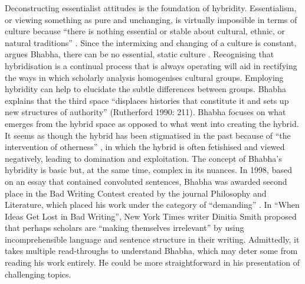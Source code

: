 	Deconstructing essentialist attitudes is the foundation of hybridity. Essentialism, or viewing something as pure and unchanging, is virtually impossible in terms of culture because “there is nothing essential or stable about cultural, ethnic, or natural traditions” \parencite [5] {VossAllen_2008}. Since the intermixing and changing of a culture is constant, argues Bhabha, there can be no essential, static culture \parencite[52] {Bhabha_1994}. Recognising that hybridisation is a continual process that is always operating will aid in rectifying the ways in which scholarly analysis homogenises cultural groups. Employing hybridity can help to elucidate the subtle differences between groups. Bhabha explains that the third space “displaces histories that constitute it and sets up new structures of authority” (Rutherford 1990: 211). Bhabha focuses on what emerges from the hybrid space as opposed to what went into creating the hybrid. It seems as though the hybrid has been stigmatised in the past because of “the intervention of otherness” \parencite  [211] {Rutherford_1990}, in which the hybrid is often fetishised and viewed negatively, leading to domination and exploitation.
	The concept of Bhabha’s hybridity is basic but, at the same time, complex in its nuances. In 1998, based on an essay that contained convoluted sentences, Bhabha was awarded second place in the Bad Writing Contest created by the journal Philosophy and Literature, which placed his work under the category of “demanding” \parencite  {Smith_1999}. In “When Ideas Get Lost in Bad Writing”, New York Times writer Dinitia Smith proposed that perhaps scholars are “making themselves irrelevant” by using incomprehensible language and sentence structure in their writing.  Admittedly, it takes multiple read-throughs to understand Bhabha, which may deter some from reading his work entirely. He could be more straightforward in his presentation of challenging topics. 
	
